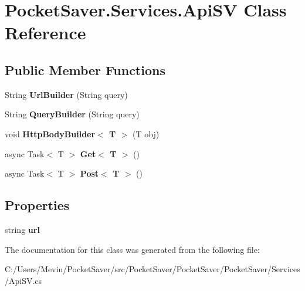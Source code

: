 \hypertarget{class_pocket_saver_1_1_services_1_1_api_s_v}{}\section{Pocket\+Saver.\+Services.\+Api\+SV Class Reference}
\label{class_pocket_saver_1_1_services_1_1_api_s_v}
\subsection*{Public Member Functions}
\begin{DoxyCompactItemize}
\item 
\mbox{\label{class_pocket_saver_1_1_services_1_1_api_s_v_aa770136ecefc3ae66bff6dc75670df45}} 
String {\bfseries Url\+Builder} (String query)
\item 
\mbox{\label{class_pocket_saver_1_1_services_1_1_api_s_v_ade3c500d8eb726bcdc31e34e601cec7c}} 
String {\bfseries Query\+Builder} (String query)
\item 
\mbox{\label{class_pocket_saver_1_1_services_1_1_api_s_v_a88eb168469465c1fcba4c25ce00c0204}} 
void {\bfseries Http\+Body\+Builder$<$ T $>$} (T obj)
\item 
\mbox{\label{class_pocket_saver_1_1_services_1_1_api_s_v_af0ad1db31c39565bc5e46d7ef1985fbb}} 
async Task$<$ T $>$ {\bfseries Get$<$ T $>$} ()
\item 
\mbox{\label{class_pocket_saver_1_1_services_1_1_api_s_v_a4db27f4d8526c13b6227e36f40e609e3}} 
async Task$<$ T $>$ {\bfseries Post$<$ T $>$} ()
\end{DoxyCompactItemize}
\subsection*{Properties}
\begin{DoxyCompactItemize}
\item 
\mbox{\label{class_pocket_saver_1_1_services_1_1_api_s_v_a61c115b80ecb71b84cd31052aa876e4e}} 
string {\bfseries url}
\end{DoxyCompactItemize}


The documentation for this class was generated from the following file\+:\begin{DoxyCompactItemize}
\item 
C\+:/\+Users/\+Mevin/\+Pocket\+Saver/src/\+Pocket\+Saver/\+Pocket\+Saver/\+Pocket\+Saver/\+Services/Api\+S\+V.\+cs\end{DoxyCompactItemize}
